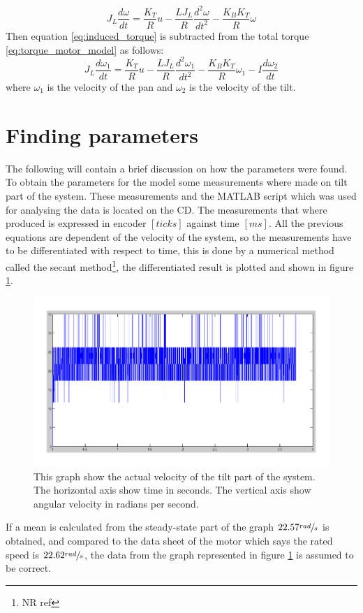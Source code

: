\begin{equation}
	J_L \frac{d\omega}{dt} = \frac{K_T}{R} u - \frac{L J_L}{R} \frac{d^{2}\omega}{dt^{2}} - \frac{K_B K_T}{R} \omega\label{eq:torque_motor_model}
\end{equation}
Then equation \ref{eq:induced_torque} is subtracted from the total torque \ref{eq:torque_motor_model} as follows:
\begin{equation}
	J_L \frac{d\omega_{1}}{dt} = \frac{K_T}{R} u - \frac{L J_L}{R} \frac{d^{2}\omega_{1}}{dt^{2}} - \frac{K_B K_T}{R} \omega_{1} - I \frac{d\omega_{2}}{dt}\label{eq:coupled_torque_motor_model}
\end{equation}
where $\omega_1$ is the velocity of the pan and $\omega_2$ is the velocity of the tilt. 

\section{Finding parameters}
The following will contain a brief discussion on how the parameters were found. To obtain the parameters for the model some measurements where made on tilt part of the system. These measurements and the MATLAB script which was used for analysing the data is located on the CD. The measurements that where produced is expressed in encoder $[ticks]$ against time $[ms]$. All the previous equations are dependent of the velocity of the system, so the measurements have to be differentiated with respect to time, this is done by a numerical method called the secant method\footnote{NR ref}, the differentiated result is plotted and shown in figure \ref{fig:measured_step_tilt}.
\begin{figure}[htb]
	\centering
	\includegraphics[width=\textwidth]{graphics/measured_step_tilt.pdf} %
	\caption{This graph show the actual velocity of the tilt part of the system. The horizontal axis show time in seconds. The vertical axis show angular velocity in radians per second.}
	\label{fig:measured_step_tilt}			%
\end{figure}
If a mean is calculated from the steady-state part of the graph $22.57 \sfrac{rad}{s}$ is obtained, and compared to the data sheet of the motor which says the rated speed is $22.62 \sfrac{rad}{s}$, the data from the graph represented in figure \ref{fig:measured_step_tilt} is assumed to be correct.

